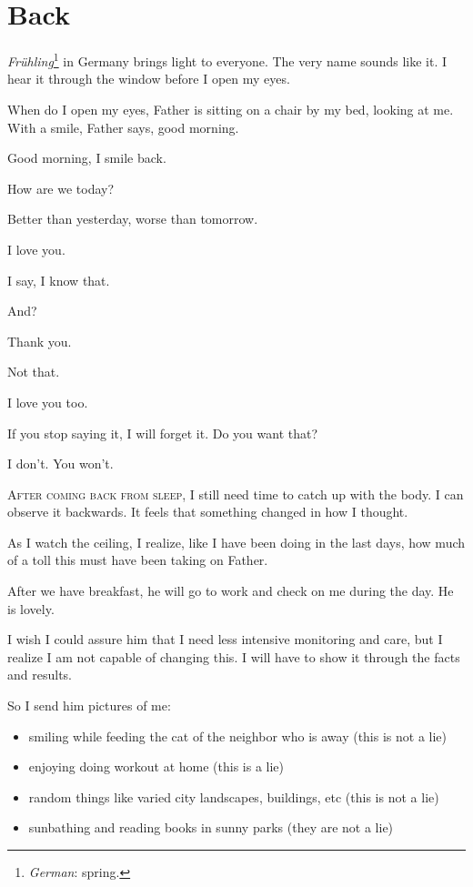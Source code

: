 \chapter*{Back}\label{back}

\emph{Frühling}\thinspace\footnote{\emph{German}: spring.} in Germany brings light to everyone. The very name sounds like it. I hear it through the window before I open my eyes.

When do I open my eyes, Father is sitting on a chair by my bed, looking at me. With a smile, Father says, good morning.

Good morning, I smile back.

How are we today?

Better than yesterday, worse than tomorrow.

I love you.

I say, I know that.

And?

Thank you.

Not that.

I love you too.

If you stop saying it, I will forget it. Do you want that?

I don't. You won't.


\thinspace\textsc{After coming back from sleep,} I still need time to catch up with the body. I can observe it backwards. It feels that something changed in how I thought. 

As I watch the ceiling, I realize, like I have been doing in the last days, how much of a toll this must have been taking on Father.

After we have breakfast, he will go to work and check on me during the day. He is lovely.

I wish I could assure him that I need less intensive monitoring and care, but I realize I am not capable of changing this. I will have to show it through the facts and results.

So I send him pictures of me:

\begin{itemize}
	\item smiling while feeding the cat of the neighbor who is away (this is
	not a lie)
	\item enjoying doing workout at home (this is a lie)
	\item random things like varied city landscapes, buildings, etc (this is not
	a lie)
	\item sunbathing and reading books in sunny parks (they are not a lie)
\end{itemize}

